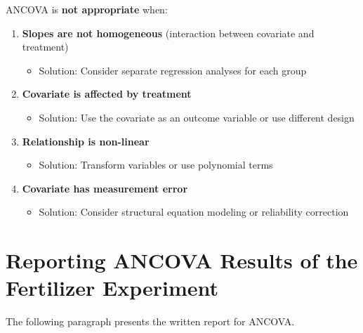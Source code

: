 \documentclass[
]{book}
\providecommand{\tightlist}{%
  \setlength{\itemsep}{0pt}\setlength{\parskip}{0pt}}
\begin{document}
ANCOVA is \textbf{not appropriate} when:

\begin{enumerate}
\def\labelenumi{\arabic{enumi}.}
\tightlist
\item
  \textbf{Slopes are not homogeneous} (interaction between covariate and treatment)

  \begin{itemize}
  \tightlist
  \item
    Solution: Consider separate regression analyses for each group
  \end{itemize}
\item
  \textbf{Covariate is affected by treatment}

  \begin{itemize}
  \tightlist
  \item
    Solution: Use the covariate as an outcome variable or use different design
  \end{itemize}
\item
  \textbf{Relationship is non-linear}

  \begin{itemize}
  \tightlist
  \item
    Solution: Transform variables or use polynomial terms
  \end{itemize}
\item
  \textbf{Covariate has measurement error}

  \begin{itemize}
  \tightlist
  \item
    Solution: Consider structural equation modeling or reliability correction
  \end{itemize}
\end{enumerate}

\section{Reporting ANCOVA Results of the Fertilizer Experiment}\label{reporting-ancova-results-of-the-fertilizer-experiment}

The following paragraph presents the written report for ANCOVA.
\end{document}
